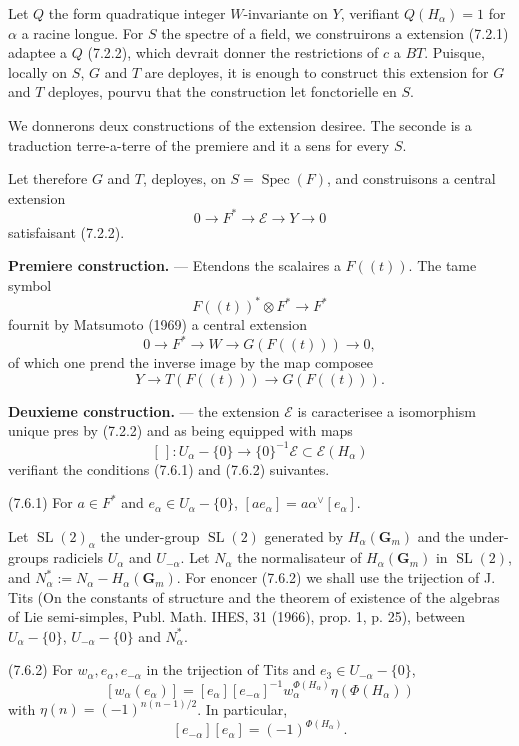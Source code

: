 \documentclass[11pt,a4paper]{article}
\theoremstyle{plain}
\theoremstyle{definition}
\DeclareMathOperator{\Spec}{Spec}
\DeclareMathOperator{\SL}{SL}
\begin{document}
Let $Q$ the form quadratique integer $W$-invariante on $Y$, verifiant $Q(H_\alpha) = 1$ for $\alpha$ a racine longue. For $S$ the spectre of a field, we construirons a extension (7.2.1) adaptee a $Q$ (7.2.2), which devrait donner the restrictions of $c$ a $BT$. Puisque, locally on $S$, $G$ and $T$ are deployes, it is enough to construct this extension for $G$ and $T$ deployes, pourvu that the construction let fonctorielle en $S$.

We donnerons deux constructions of the extension desiree. The seconde is a traduction terre-a-terre of the premiere and it a sens for every $S$.

Let therefore $G$ and $T$, deployes, on $S = \Spec(F)$, and construisons a central extension
\[
0 \to F^* \to \mathscr{E} \to Y \to 0
\]
satisfaisant (7.2.2).

\textbf{Premiere construction.} --- Etendons the scalaires a $F((t))$. The tame symbol
\[
F((t))^* \otimes F^* \to F^*
\]
fournit by Matsumoto (1969) a central extension
\[
0 \to F^* \to W \to G(F((t))) \to 0,
\]
of which one prend the inverse image by the map composee
\[
Y \to T(F((t))) \to G(F((t))).
\]

\textbf{Deuxieme construction.} --- the extension $\mathscr{E}$ is caracterisee a isomorphism unique pres by (7.2.2) and as being equipped with maps
\[
[\,] : U_\alpha - \{0\} \to \{0\}^{-1}\mathscr{E} \subset \mathscr{E}(H_\alpha)
\]
verifiant the conditions (7.6.1) and (7.6.2) suivantes.

(7.6.1) For $a \in F^*$ and $e_\alpha \in U_\alpha - \{0\}$, $[a e_\alpha] = a \alpha^{\vee}[e_\alpha]$.

Let $\SL(2)_\alpha$ the under-group $\SL(2)$ generated by $H_\alpha(\mathbf{G}_m)$ and the under-groups radiciels $U_\alpha$ and $U_{-\alpha}$. Let $N_\alpha$ the normalisateur of $H_\alpha(\mathbf{G}_m)$ in $\SL(2)$, and $N_\alpha^* := N_\alpha - H_\alpha(\mathbf{G}_m)$. For enoncer (7.6.2) we shall use the trijection of J. Tits (On the constants of structure and the theorem of existence of the algebras of Lie semi-simples, Publ. Math. IHES, 31 (1966), prop. 1, p. 25), between $U_\alpha - \{0\}$, $U_{-\alpha} - \{0\}$ and $N_\alpha^*$.

(7.6.2) For $w_\alpha, e_\alpha, e_{-\alpha}$ in the trijection of Tits and $e_3 \in U_{-\alpha} - \{0\}$,
\[
[w_\alpha(e_\alpha)] = [e_\alpha] [e_{-\alpha}]^{-1} w_\alpha^{\Phi(H_\alpha)} \eta(\Phi(H_\alpha))
\]
with $\eta(n) = (-1)^{n(n-1)/2}$. In particular,
\[
[e_{-\alpha}] [e_\alpha] = (-1)^{\Phi(H_\alpha)}.
\]
\end{document}
